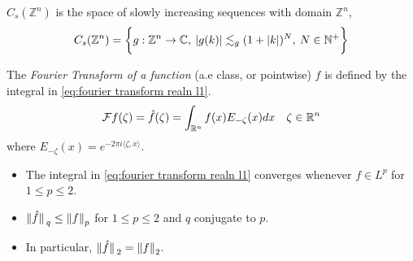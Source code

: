 \documentclass[../main-v2-manifolds.tex]{subfiles}
\begin{document}
\begin{definition}
    $C_s(\mathbb{Z}^n)$ is the space of slowly increasing sequences with domain $\mathbb{Z}^n$,
    \[
    C_s(\mathbb{Z}^n) = \biggl\{{g: \mathbb{Z}^n\to\mathbb{C},\: \vert g(k)\vert\lesssim_{g}(1+\vert {k} \vert)^{N},\:N\in\mathbb{N}^+}\biggr\}
    \]
\end{definition}
The \emph{Fourier Transform of a function} (a.e class, or pointwise) $f$ is defined by the integral in \cref{eq:fourier transform realn l1}.
\begin{equation}
    \mathcal{F}{f}(\zeta)= \hat{f}(\zeta) = \int_{{\mathbb{R}^n}} f(x)E_{-\zeta}(x)dx\quad \zeta\in{\mathbb{R}^n}
    \label{eq:fourier transform realn l1}
\end{equation}
where $E_{-\zeta}(x) = e^{-2\pi i \langle \zeta, x\rangle}$. 
\begin{itemize}
    \item The integral in \cref{eq:fourier transform realn l1} converges whenever $f\in L^p$ for $1\leq p \leq 2$. 
    \item $\norm*{\hat{f}}_{q}\leq \norm{f}_p$ for $1\leq p\leq 2$ and $q$ conjugate to $p$.
    \item In particular, $\norm*{\hat{f}}_2 = \norm{f}_{2}$.
\end{itemize}
\end{document}
